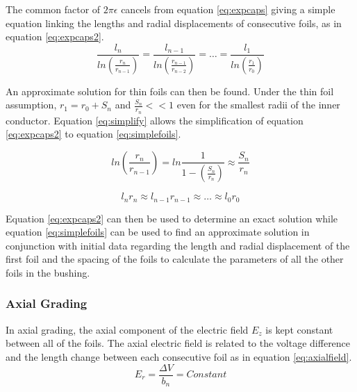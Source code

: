 The common factor of $2\pi\epsilon$ cancels from equation \ref{eq:expcaps} giving a simple equation linking the lengths and radial displacements of consecutive foils, as in equation \ref{eq:expcaps2}.
\begin{equation}
   \label{eq:expcaps2}
   \frac{l_{n}}{ln(\frac{r_{n}}{r_{n-1}})} = \frac{ l_{n-1}}{ln(\frac{r_{n-1}}{r_{n-2}})} = \dots = \frac{ l_{1}}{ln(\frac{r_{1}}{r_{0}})}
\end{equation}

An approximate solution for thin foils can then be found.
Under the thin foil assumption, $r_{1} = r_{0} + S_n$ and $\frac{S_n}{r_n}<<1$ even for the smallest radii of the inner conductor.
Equation \ref{eq:simplify} allows the simplification of equation \ref{eq:expcaps2} to equation \ref{eq:simplefoils}.

\begin{equation}
   \label{eq:simplify}
   ln(\frac{r_n}{r_{n-1}}) = ln\frac{1}{1-(\frac{S_n}{r_n})} \approx \frac{S_n}{r_n}
\end{equation}

\begin{equation}
   \label{eq:simplefoils}
   l_{n}r_{n} \approx l_{n-1}r_{n-1} \approx \dots \approx l_{0}r_{0}
\end{equation}

Equation \ref{eq:expcaps2} can then be used to determine an exact solution while equation \ref{eq:simplefoils} can be used to find an approximate solution in conjunction with initial data regarding the length and radial displacement of the first foil and the spacing of the foils to calculate the parameters of all the other foils in the bushing.

\subsubsection{Axial Grading}
In axial grading, the axial component of the electric field $E_z$ is kept constant between all of the foils. 
The axial electric field is related to the voltage difference and the length change between each consecutive foil as in equation \ref{eq:axialfield}. 
\begin{equation}
   \label{eq:axialfield}
   E_r = \frac{\Delta V}{b_n} = Constant
\end{equation}









